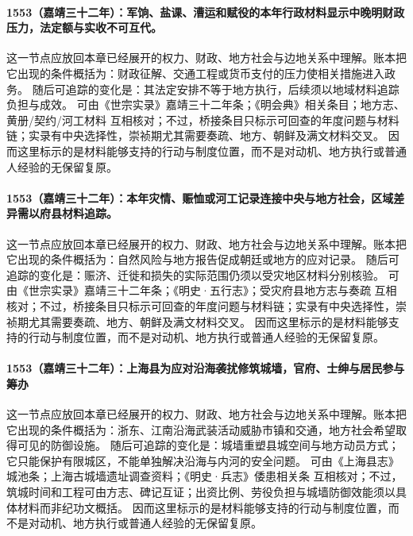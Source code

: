 \paragraph{1553（嘉靖三十二年）：军饷、盐课、漕运和赋役的本年行政材料显示中晚明财政压力，法定额与实收不可互代。} 这一节点应放回本章已经展开的权力、财政、地方社会与边地关系中理解。账本把它出现的条件概括为：财政征解、交通工程或货币支付的压力使相关措施进入政务。 随后可追踪的变化是：其法定安排不等于地方执行，后续须以地域材料追踪负担与成效。 可由《世宗实录》嘉靖三十二年条；《明会典》相关条目；地方志、黄册/契约/河工材料 互相核对；不过，桥接条目只标示可回查的年度问题与材料链；实录有中央选择性，崇祯期尤其需要奏疏、地方、朝鲜及满文材料交叉。 因而这里标示的是材料能够支持的行动与制度位置，而不是对动机、地方执行或普通人经验的无保留复原。

\paragraph{1553（嘉靖三十二年）：本年灾情、赈恤或河工记录连接中央与地方社会，区域差异需以府县材料追踪。} 这一节点应放回本章已经展开的权力、财政、地方社会与边地关系中理解。账本把它出现的条件概括为：自然风险与地方报告促成朝廷或地方的应对记录。 随后可追踪的变化是：赈济、迁徙和损失的实际范围仍须以受灾地区材料分别核验。 可由《世宗实录》嘉靖三十二年条；《明史·五行志》；受灾府县地方志与奏疏 互相核对；不过，桥接条目只标示可回查的年度问题与材料链；实录有中央选择性，崇祯期尤其需要奏疏、地方、朝鲜及满文材料交叉。 因而这里标示的是材料能够支持的行动与制度位置，而不是对动机、地方执行或普通人经验的无保留复原。

\paragraph{1553（嘉靖三十二年）：上海县为应对沿海袭扰修筑城墙，官府、士绅与居民参与筹办} 这一节点应放回本章已经展开的权力、财政、地方社会与边地关系中理解。账本把它出现的条件概括为：浙东、江南沿海武装活动威胁市镇和交通，地方社会希望取得可见的防御设施。 随后可追踪的变化是：城墙重塑县城空间与地方动员方式；它只能保护有限城区，不能单独解决沿海与内河的安全问题。 可由《上海县志》城池条；上海古城墙遗址调查资料；《明史·兵志》倭患相关条 互相核对；不过，筑城时间和工程可由方志、碑记互证；出资比例、劳役负担与城墙防御效能须以具体材料而非纪功文概括。 因而这里标示的是材料能够支持的行动与制度位置，而不是对动机、地方执行或普通人经验的无保留复原。

